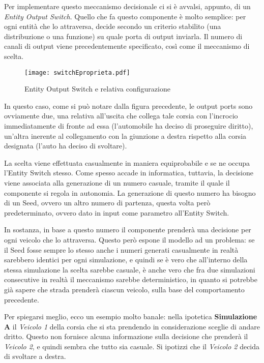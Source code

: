 Per implementare questo meccanismo decisionale ci si è avvalsi, appunto, di un \textit{Entity Output Switch}. Quello che fa questo componente è molto semplice: per ogni entità che lo attraversa, decide secondo un criterio stabilito (una distribuzione o una funzione) su quale porta di output inviarla. Il numero di canali di output viene precedentemente specificato, così come il meccanismo di scelta. 

\begin{figure}[H]
  \texttt{[image: switchEproprieta.pdf]}
  \caption{Entity Output Switch e relativa configurazione}
  \label{fig:}
\end{figure}

In questo caso, come si può notare dalla figura precedente, le output ports sono ovviamente due, una relativa all'uscita che collega tale corsia con l'incrocio immediatamente di fronte ad essa (l'automobile ha deciso di proseguire diritto), un'altra inerente al collegamento con la giunzione a destra rispetto alla corsia designata (l'auto ha deciso di svoltare).

La scelta viene effettuata casualmente in maniera equiprobabile e se ne occupa l'Entity Switch stesso. Come spesso accade in informatica, tuttavia, la decisione viene associata alla generazione di un numero casuale, tramite il quale il componente si regola in autonomia. La generazione di questo numero ha bisogno di un Seed, ovvero un altro numero di partenza, questa volta però predeterminato, ovvero dato in input come parametro all'Entity Switch.

In sostanza, in base a questo numero il componente prenderà una decisione per ogni veicolo che lo attraversa. Questo però espone il modello ad un problema: se il Seed fosse sempre lo stesso anche i numeri generati casualmente in realtà sarebbero identici per ogni simulazione, e quindi se è vero che all'interno della stessa simulazione la scelta sarebbe casuale, è anche vero che fra due simulazioni consecutive in realtà il meccanismo sarebbe deterministico, in quanto si potrebbe già sapere che strada prenderà ciascun veicolo, sulla base del comportamento precedente.

Per spiegarsi meglio, ecco un esempio molto banale: nella ipotetica \textbf{Simulazione A} il \textit{Veicolo 1} della corsia che si sta prendendo in considerazione sceglie di andare dritto. Questo non fornisce alcuna informazione sulla decisione che  prenderà il \textit{Veicolo 2}, e quindi sembra che tutto sia casuale. Si ipotizzi che il \textit{Veicolo 2} decida di svoltare a destra.

